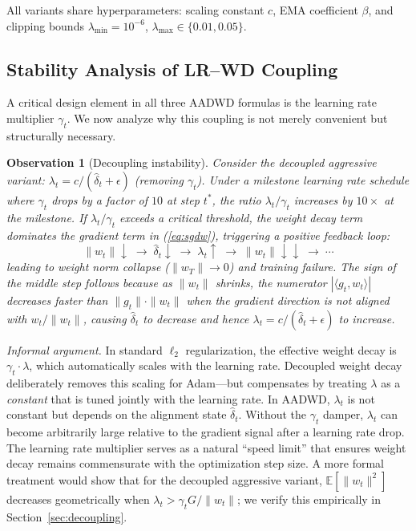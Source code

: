 \documentclass{article}
\newtheorem{observation}{Observation}
\begin{document}
All variants share hyperparameters: scaling constant $c$, EMA coefficient $\beta$,
and clipping bounds $\lambda_{\min} = 10^{-6}$,
$\lambda_{\max} \in \{0.01, 0.05\}$.

\subsection{Stability Analysis of LR--WD Coupling}
\label{sec:coupling}

A critical design element in all three AADWD formulas is the learning rate
multiplier $\gamma_t$.
We now analyze why this coupling is not merely convenient but structurally necessary.

\begin{observation}[Decoupling instability]
  \label{obs:instability}
  Consider the decoupled aggressive variant:
  $\lambda_t = c / (\hat{\delta}_t + \epsilon)$ (removing $\gamma_t$).
  Under a milestone learning rate schedule where $\gamma_t$ drops by a factor of
  $10$ at step $t^*$, the ratio $\lambda_t / \gamma_t$ increases by $10\times$ at
  the milestone.
  If $\lambda_t / \gamma_t$ exceeds a critical threshold, the weight decay term
  dominates the gradient term in (\ref{eq:sgdw}), triggering a positive feedback
  loop:
  \begin{equation}
    \|w_t\| \downarrow \;\to\; \hat{\delta}_t \downarrow \;\to\;
    \lambda_t \uparrow \;\to\; \|w_t\| \downarrow\downarrow \;\to\; \cdots
    \label{eq:feedback}
  \end{equation}
  leading to weight norm collapse ($\|w_T\| \to 0$) and training failure.
  The sign of the middle step follows because as $\|w_t\|$ shrinks, the numerator
  $|\langle g_t, w_t \rangle|$ decreases faster than $\|g_t\| \cdot \|w_t\|$ when
  the gradient direction is not aligned with $w_t / \|w_t\|$, causing
  $\hat{\delta}_t$ to decrease and hence $\lambda_t = c / (\hat{\delta}_t + \epsilon)$
  to increase.
\end{observation}

\emph{Informal argument.}
In standard $\ell_2$ regularization, the effective weight decay is $\gamma_t \cdot
\lambda$, which automatically scales with the learning rate.
Decoupled weight decay \citep{loshchilov2019decoupled} deliberately removes this
scaling for Adam---but compensates by treating $\lambda$ as a \emph{constant} that
is tuned jointly with the learning rate.
In AADWD, $\lambda_t$ is not constant but depends on the alignment state
$\hat{\delta}_t$.
Without the $\gamma_t$ damper, $\lambda_t$ can become arbitrarily large relative to
the gradient signal after a learning rate drop.
The learning rate multiplier serves as a natural ``speed limit'' that ensures weight
decay remains commensurate with the optimization step size.
A more formal treatment would show that for the decoupled aggressive variant,
$\mathbb{E}[\|w_t\|^2]$ decreases geometrically when
$\lambda_t > \gamma_t G / \|w_t\|$; we verify this empirically in
Section~\ref{sec:decoupling}.
\end{document}
